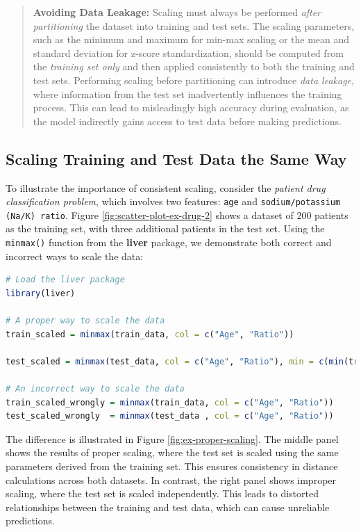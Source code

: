 \documentclass[
  11pt,
]{book}
\newcommand{\passthrough}[1]{#1}
\theoremstyle{definition}
\theoremstyle{definition}
\theoremstyle{definition}
\theoremstyle{definition}
\theoremstyle{remark}
\begin{document}
\begin{quote}
\textbf{Avoiding Data Leakage:}
Scaling must always be performed \emph{after partitioning} the dataset into training and test sets. The scaling parameters, such as the minimum and maximum for min-max scaling or the mean and standard deviation for z-score standardization, should be computed from the \emph{training set only} and then applied consistently to both the training and test sets. Performing scaling before partitioning can introduce \emph{data leakage}, where information from the test set inadvertently influences the training process. This can lead to misleadingly high accuracy during evaluation, as the model indirectly gains access to test data before making predictions.
\end{quote}

\subsection{Scaling Training and Test Data the Same Way}\label{scaling-training-and-test-data-the-same-way}

To illustrate the importance of consistent scaling, consider the \emph{patient drug classification problem}, which involves two features: \passthrough{\lstinline!age!} and \passthrough{\lstinline!sodium/potassium (Na/K) ratio!}. Figure \ref{fig:scatter-plot-ex-drug-2} shows a dataset of 200 patients as the training set, with three additional patients in the test set. Using the \passthrough{\lstinline!minmax()!} function from the \textbf{liver} package, we demonstrate both correct and incorrect ways to scale the data:

\begin{lstlisting}[language=R]
# Load the liver package
library(liver)

# A proper way to scale the data
train_scaled = minmax(train_data, col = c("Age", "Ratio"))

test_scaled = minmax(test_data, col = c("Age", "Ratio"), min = c(min(train_data$Age), min(train_data$Ratio)), max = c(max(train_data$Age), max(train_data$Ratio)))

# An incorrect way to scale the data
train_scaled_wrongly = minmax(train_data, col = c("Age", "Ratio"))
test_scaled_wrongly  = minmax(test_data , col = c("Age", "Ratio"))
\end{lstlisting}

The difference is illustrated in Figure \ref{fig:ex-proper-scaling}. The middle panel shows the results of proper scaling, where the test set is scaled using the same parameters derived from the training set. This ensures consistency in distance calculations across both datasets. In contrast, the right panel shows improper scaling, where the test set is scaled independently. This leads to distorted relationships between the training and test data, which can cause unreliable predictions.
\end{document}
